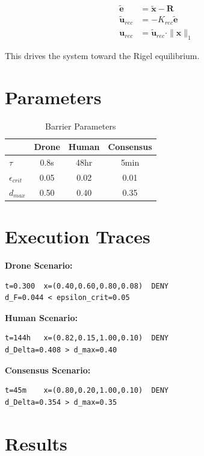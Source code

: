 \documentclass[letterpaper, 10 pt, conference]{ieeeconf}
\begin{document}
\begin{align}
\tilde{\mathbf{e}} &= \tilde{\mathbf{x}} - \mathbf{R} \\
\tilde{\mathbf{u}}_{rec} &= -K_{rec} \tilde{\mathbf{e}} \\
\mathbf{u}_{rec} &= \tilde{\mathbf{u}}_{rec} \cdot \|\mathbf{x}\|_1
\end{align}

This drives the system toward the Rigel equilibrium.

\section{Parameters}

\begin{table}[h]
\centering
\caption{Barrier Parameters}
\begin{tabular}{lccc}
\toprule
 & Drone & Human & Consensus \\
\midrule
$\tau$ & 0.8s & 48hr & 5min \\
$\epsilon_{crit}$ & 0.05 & 0.02 & 0.01 \\
$d_{max}$ & 0.50 & 0.40 & 0.35 \\
\bottomrule
\end{tabular}
\end{table}

\section{Execution Traces}

\textbf{Drone Scenario:}
\begin{verbatim}
t=0.300  x=(0.40,0.60,0.80,0.08)  DENY
d_F=0.044 < epsilon_crit=0.05
\end{verbatim}

\textbf{Human Scenario:}
\begin{verbatim}
t=144h   x=(0.82,0.15,1.00,0.10)  DENY
d_Delta=0.408 > d_max=0.40
\end{verbatim}

\textbf{Consensus Scenario:}
\begin{verbatim}
t=45m    x=(0.80,0.20,1.00,0.10)  DENY
d_Delta=0.354 > d_max=0.35
\end{verbatim}

\section{Results}
\end{document}
